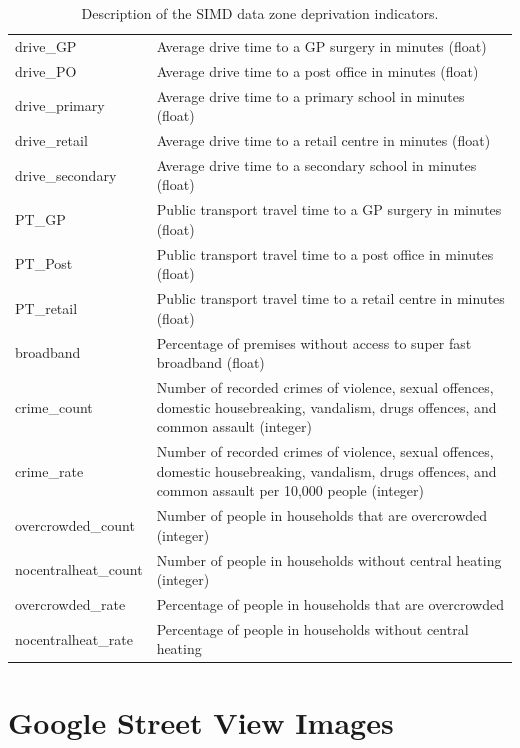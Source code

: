 \documentclass{thesis}
\begin{document}
\begin{table}[ht!]
\begin{tabular}{||l p{100mm}||}
     drive\_GP & Average drive time to a GP surgery in minutes (float) \\
     drive\_PO & Average drive time to a post office in minutes (float) \\
     drive\_primary & Average drive time to a primary school in minutes (float) \\
     drive\_retail & Average drive time to a retail centre in minutes (float) \\
     drive\_secondary & Average drive time to a secondary school in minutes (float) \\
     PT\_GP & Public transport travel time to a GP surgery in minutes (float) \\
     PT\_Post & Public transport travel time to a post office in minutes (float) \\
     PT\_retail & Public transport travel time to a retail centre in minutes (float) \\
     broadband & Percentage of premises without access to super fast broadband (float) \\
     crime\_count & Number of recorded crimes of violence, sexual offences, domestic housebreaking, vandalism, \newline drugs offences, and common assault (integer) \\
     crime\_rate & Number of recorded crimes of violence, sexual offences, domestic housebreaking, vandalism, \newline drugs offences, and common assault per 10,000 people (integer) \\
     overcrowded\_count & Number of people in households that are overcrowded (integer) \\
     nocentralheat\_count & Number of people in households without central heating (integer) \\
     overcrowded\_rate & Percentage of people in households that are overcrowded \\
     nocentralheat\_rate & Percentage of people in households without central heating \\ [1ex] 
     \hline
    \end{tabular}
    \hspace{100mm}
    \caption{Description of the SIMD data zone deprivation indicators.}
    \label{table:simd-deprivation-indicators}
\end{table}

\section{Google Street View Images}
\end{document}
